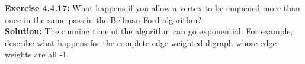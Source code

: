 \documentclass[11pt,fleqn]{article}
\begin{document}
\textbf{Exercise 4.4.17:} What happens if you allow a vertex to be enqueued more than once in the same
pass in the Bellman-Ford algorithm?\\

\textbf{Solution:} The running time of the algorithm can go exponential. For example, describe
what happens for the complete edge-weighted digraph whose edge weights are all -1.


	
\end{document}
